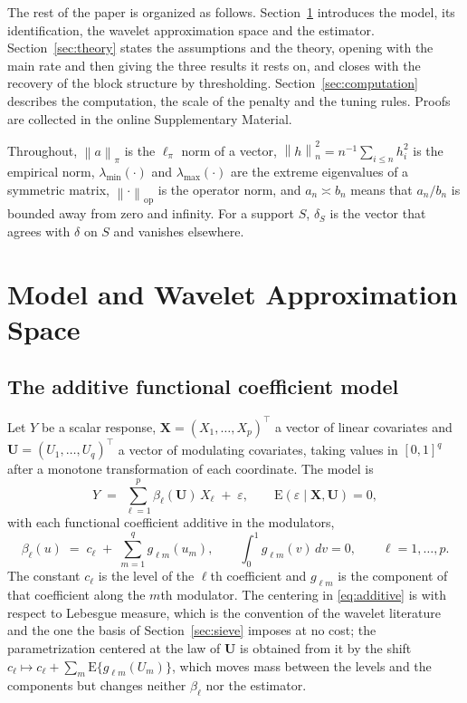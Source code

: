\documentclass[12pt]{article} %
\theoremstyle{definition}
\newcommand{\E}{\mathrm{E}}
\newcommand{\T}{^{\top}}
\newcommand{\norm}[1]{\left\lVert #1 \right\rVert}
\newcommand{\normn}[1]{\left\lVert #1 \right\rVert_{n}}
\newcommand{\cv}{\ell}
\newcommand{\md}{m}
\newcommand{\bX}{\mathbf{X}}
\newcommand{\bU}{\mathbf{U}}
\newcommand{\fcoef}[1]{\beta_{#1}}
\newcommand{\lvl}[1]{c_{#1}}
\newcommand{\gcomp}[2]{g_{#1#2}}
\newcommand{\lmin}{\lambda_{\min}}
\newcommand{\lmaxx}{\lambda_{\max}}
\newcommand{\opnorm}[1]{\left\lVert #1 \right\rVert_{\mathrm{op}}}
\begin{document}
The rest of the paper is organized as follows. Section~\ref{sec:model}
introduces the model, its identification, the wavelet \textcolor{colR1}{approximation space} and the estimator.
Section~\ref{sec:theory} states the assumptions and the theory, opening with
the main rate and then giving the three results it rests on\textcolor{colR1}{, and
closes with the recovery of the block structure by thresholding}.
Section~\ref{sec:computation} describes the computation, the scale of the
penalty and the tuning rules. Proofs are collected in the online Supplementary
Material.

Throughout, $\norm{a}_\pi$ is the $\ell_\pi$ norm of a vector,
$\normn{h}^2 = n^{-1}\sum_{i\le n} h_i^2$ is the empirical norm,
$\lmin(\cdot)$ and $\lmaxx(\cdot)$ are the extreme eigenvalues of a symmetric
matrix, $\opnorm{\cdot}$ is the operator norm, and $a_n \asymp b_n$ means that
$a_n/b_n$ is bounded away from zero and infinity. For a support
$S$, $\delta_S$ is the vector that agrees with $\delta$ on $S$ and vanishes
elsewhere.

\section{Model and Wavelet \texorpdfstring{\textcolor{colR1}{Approximation Space}}{Approximation Space}}
\label{sec:model}

\subsection{The additive functional coefficient model}
\label{sec:model-def}

Let $Y$ be a scalar response, $\bX = (X_1,\dots,X_p)\T$ a vector of linear
covariates and $\bU = (U_1,\dots,U_q)\T$ a vector of modulating covariates,
taking values in $[0,1]^q$ after a monotone transformation of each
coordinate. The model is
\begin{equation}
  \label{eq:model}
  Y \;=\; \sum_{\cv=1}^{p} \fcoef{\cv}(\bU)\,X_{\cv} \;+\; \varepsilon,
  \qquad \E(\varepsilon \mid \bX, \bU) = 0,
\end{equation}
with each functional coefficient additive in the modulators,
\begin{equation}
  \label{eq:additive}
  \fcoef{\cv}(u) \;=\; \lvl{\cv} \;+\; \sum_{\md=1}^{q}\gcomp{\cv}{\md}(u_{\md}),
  \qquad \int_{0}^{1}\gcomp{\cv}{\md}(v)\,dv = 0,
  \qquad \cv = 1,\dots,p .
\end{equation}
The constant $\lvl{\cv}$ is the level of the $\cv$th coefficient and
$\gcomp{\cv}{\md}$ is the component of that coefficient along the $\md$th
modulator. The centering in \eqref{eq:additive} is with respect to Lebesgue
measure, which is the convention of the wavelet literature and the one the
basis of Section~\ref{sec:sieve} imposes at no cost; the parametrization
centered at the law of $\bU$ is obtained from it by the shift
$\lvl{\cv} \mapsto \lvl{\cv} + \sum_{\md}\E\{\gcomp{\cv}{\md}(U_{\md})\}$,
which moves mass between the levels and the components but changes neither
$\fcoef{\cv}$ nor the estimator.
\end{document}

